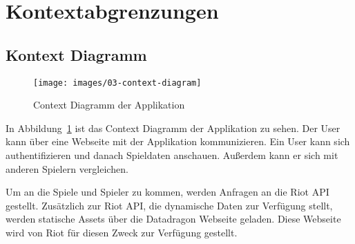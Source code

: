 \section{Kontextabgrenzungen}
\subsection{Kontext Diagramm}

\begin{figure}
    \centering
    \texttt{[image: images/03-context-diagram]}
    \caption{Context Diagramm der Applikation}
    \label{fig:context-diagram}
\end{figure}

In Abbildung~\ref{fig:context-diagram} ist das Context Diagramm der Applikation zu sehen.
Der User kann über eine Webseite mit der Applikation kommunizieren.
Ein User kann sich authentifizieren und danach Spieldaten anschauen.
Außerdem kann er sich mit anderen Spielern vergleichen.

Um an die Spiele und Spieler zu kommen, werden Anfragen an die Riot API gestellt.
Zusätzlich zur Riot API, die dynamische Daten zur Verfügung stellt, werden statische Assets über die Datadragon
Webseite geladen.
Diese Webseite wird von Riot für diesen Zweck zur Verfügung gestellt.

